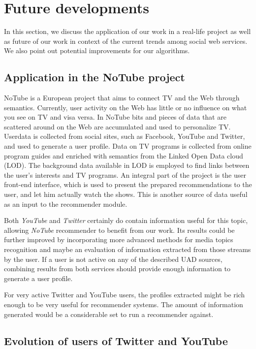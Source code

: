 \section{Future developments}
\label{sec:future}

In this section, we discuss the application of our work in a real-life project
as well as future of our work in context of the current
trends among social web services. We also point out potential improvements for
our algorithms.

\subsection{Application in the NoTube project}

NoTube is a European project that aims to connect TV and the Web through
semantics. Currently, user activity on the Web has little or no influence on
what you see on TV and visa versa. In NoTube bits and pieces of data that are
scattered around on the Web are accumulated and used to personalize TV. Userdata
is collected from social sites, such as Facebook, YouTube and Twitter, and used
to generate a user profile. Data on TV programs is collected from online program
guides and enriched with semantics from the Linked Open Data cloud (LOD). The
background data available in LOD is employed to find links between the user's
interests and TV programs. An integral part of the project is the user front-end
interface, which is used to present the prepared recommendations to the user,
and let him actually watch the shows. This is another source of data useful as
an input to the recommender module.

Both \textit{YouTube} and \textit{Twitter} certainly do contain information
useful for this topic, allowing \textit{NoTube} recommender to benefit from
our work. Its results could be further improved by incorporating more advanced methods
for media topics recognition and maybe an evaluation of information extracted
from those streams by the user. If a user is not active on any of the described
UAD sources, combining results from both services should provide enough information
to generate a user profile.

For very active Twitter and YouTube users, the profiles extracted
might be rich enough to be very useful for recommender systems. The amount of
information generated would be a considerable set to run a recommender against.

\subsection{Evolution of users of Twitter and YouTube}

